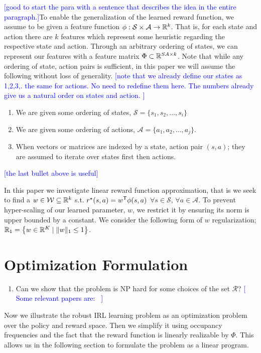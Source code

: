 \documentclass[11pt]{uai2023}
\newcommand{\mm}[1]{\textcolor{blue}{[#1]}}
\begin{document}
\mm{good to start the para with a sentence that describes the idea in the entire paragraph.}To enable the generalization of the learned reward function, we assume to be given a feature function $\phi: \mathcal{S} \times \mathcal{A}\to \mathbb{R}^k$. That is, for each state and action there are $k$ features which represent some heuristic regarding the respective state and action. Through an arbitrary ordering of states, we can represent our features with a feature matrix $\Phi \subset \mathbb{R}^{SA\times k}$. Note that while any ordering of state, action pairs is sufficient, in this paper we will assume the following without loss of generality.
\mm{note that we already define our states as 1,2,3,. the same for actions. No need to redefine them here. The numbers already give us a natural order on states and action. }
\begin{enumerate}
	\item We are given some ordering of states, $\mathcal{S} = \{ s_1, s_2, \dots, s_i \}$
	\item We are given some ordering of actions, $\mathcal{A} = \{ a_1, a_2, \dots, a_j \}$.
	\item When vectors or matrices are indexed by a state, action pair $(s,a)$; they are assumed to iterate over
	      states first then actions.
\end{enumerate}
\mm{the last bullet above is useful}

In this paper we investigate linear reward function approximation, that is we seek to find a $w \in \mathcal{W} \subseteq \mathbb{R}^k$ s.t. $r^{\mathnormal{\star}}(s,a) = w^{\mathsf{T}}
	\phi(s,a)$ $\forall s \in \mathcal{S}$, $\forall a \in \mathcal{A}$. To
prevent hyper-scaling of our learned parameter, $w$, we restrict it by
ensuring its norm is upper bounded by a constant. We consider the following
form of $w$ regularization; $\mathbb{R}_{1} = \left\{ w \in \mathbb{R}^K
	\mid \| w \|_1 \le 1 \right\}$.

\section{Optimization Formulation}\label{sec:optimization-formulation}
\begin{enumerate}
	\item Can we show that the problem is NP hard for some choices of the set $\mathcal{R}$? \mm{
		      Some relevant papers are:~\cite{Wu2013,Eldar2008}
	}
\end{enumerate}
Now we illustrate the robust IRL learning problem as an optimization problem over the policy and reward space. Then we simplify it using occupancy frequencies
and the fact that the reward function is linearly realizable by $\Phi$. This allows us in the following section to formulate the problem as a linear program.
\end{document}
